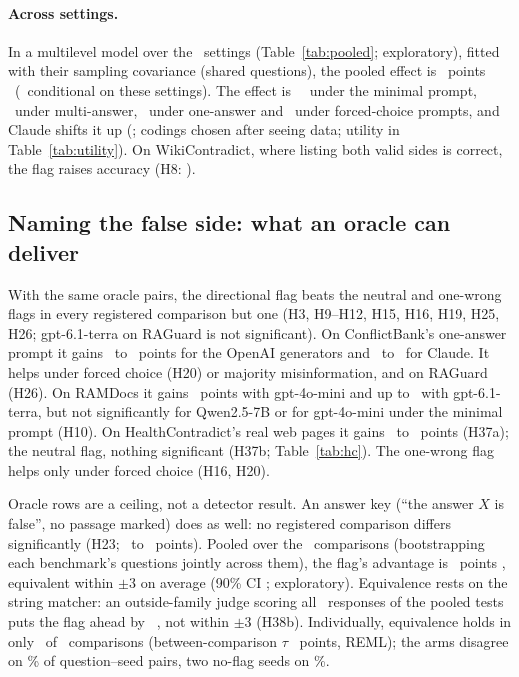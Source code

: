 \paragraph{Across settings.} In a multilevel model over the \neuMlK\ settings (Table~\ref{tab:pooled}; exploratory),
fitted with their sampling covariance (shared questions), the pooled effect is \neuMlMu\ points
\neuMlCI\ (\neuMlCIDesign\ conditional on these settings). The effect is
\neuPolMinimal\ \neuPolMinimalCI\ under the minimal prompt, \neuPolMulti\ under
multi-answer, \neuPolSingle\ under one-answer and \neuPolForced\ under forced-choice prompts, and Claude
shifts it up (\neuMlAnthropic; codings chosen after seeing data; utility in Table~\ref{tab:utility}). On WikiContradict, where listing both valid sides is
correct, the flag raises accuracy (H8: \wikiOracleFlag).

\subsection{Naming the false side: what an oracle can deliver}
\label{sec:direction}
With the same oracle pairs, the directional flag beats the neutral and one-wrong flags in every registered comparison
but one (H3, H9--H12, H15, H16, H19, H25, H26; gpt-6.1-terra on RAGuard is not significant). On ConflictBank's
one-answer prompt it gains \azSgTerraOracleFlagDirectionalConflict\ to \azSgLunaOracleFlagDirectionalConflict\
points for the OpenAI generators and \azSgSonnetOracleFlagDirectionalConflict\ to
\azSgHaikuOracleFlagDirectionalConflict\ for Claude. It helps under forced choice (H20) or majority
misinformation, and on RAGuard (H26). On RAMDocs it gains \adOracleDirConf\ points with gpt-4o-mini and
up to \azRdTerraOracleFlagDirectionalConflict\ with gpt-6.1-terra, but not significantly for Qwen2.5-7B or for
gpt-4o-mini under the minimal prompt (H10). On HealthContradict's real web pages it gains \hcDirMini\ to \hcDirHaiku\
points (H37a); the neutral flag, nothing significant (H37b; Table~\ref{tab:hc}). The
one-wrong flag helps only under forced choice (H16, H20).

Oracle rows are a ceiling, not a detector result. An answer key (``the answer $X$ is false'', no passage
marked) does as well: no registered comparison differs significantly (H23; \keyDiffMin\ to \keyDiffMax\ points).
Pooled over the \PoolTwentyThreeK\ comparisons (bootstrapping each benchmark's questions
jointly across them), the flag's advantage is \PoolTwentyThree\ points \PoolTwentyThreeCI, equivalent within $\pm$3 on average
(90\% CI \PoolTwentyThreeCINinety; exploratory). Equivalence rests on the string matcher: an outside-family judge scoring all
\jdN\ responses of the pooled tests puts the flag ahead by \jdTwentyThreeJ\ \jdTwentyThreeJCI, not within $\pm$3
(H38b). Individually, equivalence holds in only \hTwentyThreeEqN\ of
\hTwentyThreeK\ comparisons (between-comparison $\tau$ \hTwentyThreeTau\ points, REML); the arms disagree on \agrTwentyThreeDisMatched\% of question--seed pairs, two no-flag seeds on \agrTwentyThreeNull\%.

